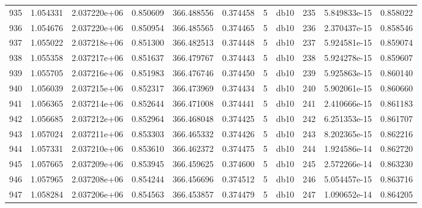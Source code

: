 \begin{tabular}{lrrrrrrlrrr}
935  &    1.054331 &        2.037220e+06 &  0.850609 &              366.488556 &    0.374458 &       5 &         db10 &    235 &   5.849833e-15 &      0.858022 \\
936  &    1.054676 &        2.037220e+06 &  0.850954 &              366.485565 &    0.374465 &       5 &         db10 &    236 &   2.370437e-15 &      0.858546 \\
937  &    1.055022 &        2.037218e+06 &  0.851300 &              366.482513 &    0.374448 &       5 &         db10 &    237 &   5.924581e-15 &      0.859074 \\
938  &    1.055358 &        2.037217e+06 &  0.851637 &              366.479767 &    0.374443 &       5 &         db10 &    238 &   5.924278e-15 &      0.859607 \\
939  &    1.055705 &        2.037216e+06 &  0.851983 &              366.476746 &    0.374450 &       5 &         db10 &    239 &   5.925863e-15 &      0.860140 \\
940  &    1.056039 &        2.037215e+06 &  0.852317 &              366.473969 &    0.374434 &       5 &         db10 &    240 &   5.902061e-15 &      0.860660 \\
941  &    1.056365 &        2.037214e+06 &  0.852644 &              366.471008 &    0.374441 &       5 &         db10 &    241 &   2.410666e-15 &      0.861183 \\
942  &    1.056685 &        2.037212e+06 &  0.852964 &              366.468048 &    0.374425 &       5 &         db10 &    242 &   6.251353e-15 &      0.861707 \\
943  &    1.057024 &        2.037211e+06 &  0.853303 &              366.465332 &    0.374426 &       5 &         db10 &    243 &   8.202365e-15 &      0.862216 \\
944  &    1.057331 &        2.037210e+06 &  0.853610 &              366.462372 &    0.374475 &       5 &         db10 &    244 &   1.924586e-14 &      0.862720 \\
945  &    1.057665 &        2.037209e+06 &  0.853945 &              366.459625 &    0.374600 &       5 &         db10 &    245 &   2.572266e-14 &      0.863230 \\
946  &    1.057965 &        2.037208e+06 &  0.854244 &              366.456696 &    0.374512 &       5 &         db10 &    246 &   5.054457e-15 &      0.863716 \\
947  &    1.058284 &        2.037206e+06 &  0.854563 &              366.453857 &    0.374479 &       5 &         db10 &    247 &   1.090652e-14 &      0.864205 \\

\end{tabular}
